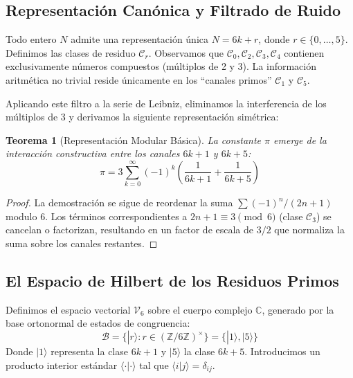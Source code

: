 \documentclass{article}
\theoremstyle{plain}
\newtheorem{theorem}{Teorema}[section]
\theoremstyle{definition}
\theoremstyle{remark}
\numberwithin{equation}{section}
\begin{document}
\subsection{Representación Canónica y Filtrado de Ruido}

Todo entero $N$ admite una representación única $N = 6k + r$, donde $r \in \{0, \dots, 5\}$. Definimos las clases de residuo $\mathcal{C}_r$. Observamos que $\mathcal{C}_0, \mathcal{C}_2, \mathcal{C}_3, \mathcal{C}_4$ contienen exclusivamente números compuestos (múltiplos de 2 y 3). La información aritmética no trivial reside únicamente en los ``canales primos'' $\mathcal{C}_1$ y $\mathcal{C}_5$.

Aplicando este filtro a la serie de Leibniz, eliminamos la interferencia de los múltiplos de 3 y derivamos la siguiente representación simétrica:

\begin{theorem}[Representación Modular Básica]
\label{thm:pi-modular}
La constante $\pi$ emerge de la interacción constructiva entre los canales $6k+1$ y $6k+5$:
\begin{equation}
\pi = 3\sum_{k=0}^{\infty} (-1)^k\left(\frac{1}{6k+1} + \frac{1}{6k+5}\right)
\end{equation}
\end{theorem}

\begin{proof}
La demostración se sigue de reordenar la suma $\sum (-1)^n/(2n+1)$ modulo 6. Los términos correspondientes a $2n+1 \equiv 3 \pmod 6$ (clase $\mathcal{C}_3$) se cancelan o factorizan, resultando en un factor de escala de $3/2$ que normaliza la suma sobre los canales restantes.
\end{proof}

\subsection{El Espacio de Hilbert de los Residuos Primos}

Definimos el espacio vectorial $\mathcal{V}_6$ sobre el cuerpo complejo $\mathbb{C}$, generado por la base ortonormal de estados de congruencia:
\begin{equation}
    \mathcal{B} = \{ |r\rangle : r \in (\mathbb{Z}/6\mathbb{Z})^\times \} = \{ |1\rangle, |5\rangle \}
\end{equation}
Donde $|1\rangle$ representa la clase $6k+1$ y $|5\rangle$ la clase $6k+5$.
Introducimos un producto interior estándar $\langle \cdot | \cdot \rangle$ tal que $\langle i | j \rangle = \delta_{ij}$.
\end{document}
